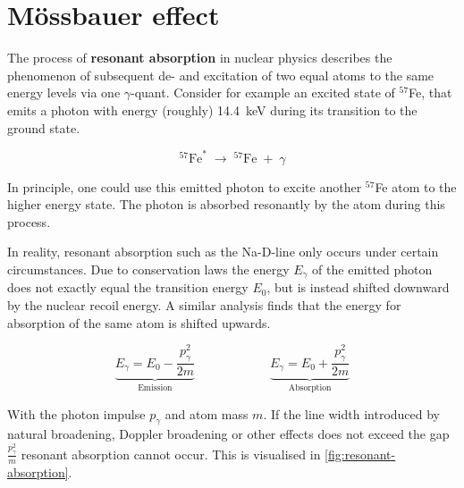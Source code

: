 
\section{Mössbauer effect}
\label{sec:mössbauer-effect}

The process of \textbf{resonant absorption} in nuclear physics describes the 
phenomenon of subsequent de- and excitation of two equal atoms to the same energy 
levels via one $\gamma$-quant. Consider for example an excited state of $^{57}$Fe,
that emits a photon with energy (roughly) \SI{14.4}{\kilo\electronvolt} during its 
transition to the ground state.

\begin{equation*}
^{57}\text{Fe}^*\;\longrightarrow\;^{57}\text{Fe}\;+\;\gamma  
\end{equation*}

In principle, one could use this emitted photon to excite another $^{57}$Fe atom to 
the higher energy state. The photon is absorbed resonantly by the atom during this 
process.

In reality, resonant absorption such as the Na-D-line only occurs under certain
circumstances. Due to conservation laws the energy $E_\gamma$ of the emitted photon
does not exactly equal the transition energy $E_0$, but is instead shifted downward
by the nuclear recoil energy. A similar analysis finds that the energy for absorption
of the same atom is shifted upwards. 

\begin{equation}
\underbrace{E_\gamma = E_0 - \frac{p_\gamma^2}{2m}}_\text{Emission} \qquad\qquad\qquad \underbrace{E_\gamma = E_0 + \frac{p_\gamma^2}{2m}}_\text{Absorption} 
\end{equation}

With the photon impulse $p_\gamma$ and atom mass $m$. If the line width introduced by
natural broadening, Doppler broadening or other  effects does not exceed the gap 
$\frac{p_\gamma^2}{m}$ resonant absorption cannot occur. This is visualised in 
\autoref{fig:resonant-absorption}.
